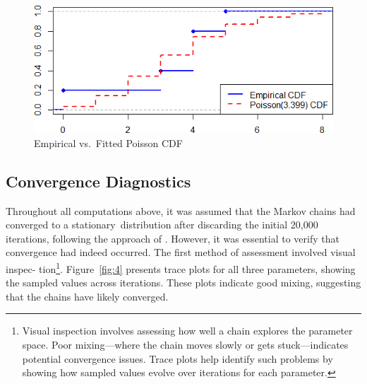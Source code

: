 \documentclass{Class/julia}
\begin{document}
\begin{figure}[!ht]
    \centering
    \caption{Empirical vs.\ Fitted Poisson CDF}
    \label{fig:3}
    \includegraphics[width=.5\textwidth]{rytgaard1990/empirical_vs_poisson.png}
\end{figure}

\subsection{Convergence Diagnostics}

Throughout all computations above, it was assumed that the Markov chains had converged to a stationary~distribution after discarding the initial 20,000 iterations, following the approach of \citet{dudley2006bayesian}. However, it was essential to verify that convergence had indeed occurred. The first method of assessment involved visual inspec- tion\footnote{Visual inspection involves assessing how well a chain explores the parameter space. Poor mixing—where the chain moves slowly or gets stuck—indicates potential convergence issues. Trace plots help identify such problems by showing how sampled values evolve over iterations for each parameter.}. Figure~\ref{fig:4} presents trace plots for all three parameters, showing the sampled values across iterations. These plots indicate good mixing, suggesting that the chains have likely converged.
\end{document}
